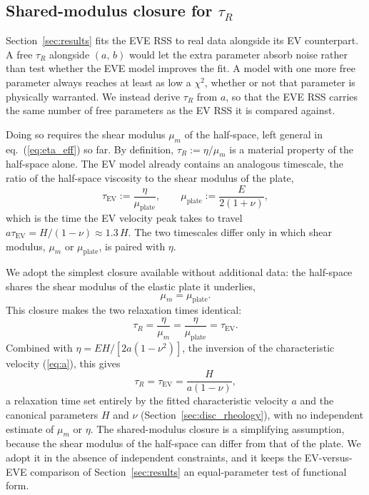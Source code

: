 \documentclass[extra]{gji}
\begin{document}
\subsection{Shared-modulus closure for $\tau_R$}
\label{sec:tauR_shared}

Section~\ref{sec:results} fits the EVE RSS to real data alongside its
EV counterpart.  A free $\tau_R$ alongside $(a,\,b)$ would let the extra
parameter absorb noise rather than test whether the EVE model improves the
fit.  A model with one more free parameter always reaches at least as low a
$\chi^2$, whether or not that parameter is physically warranted.  We
instead derive $\tau_R$ from $a$, so that the EVE RSS carries the same
number of free parameters as the EV RSS it is compared against.

Doing so requires the shear modulus $\mu_m$ of the half-space, left
general in eq.~(\ref{eq:eta_eff}) so far. By definition,
$\tau_R := \eta/\mu_m$ is a material property of the half-space alone.
The EV model already contains an analogous timescale, the ratio of the
half-space viscosity to the shear modulus of the plate,
\begin{equation}
\tau_{\text{EV}} := \frac{\eta}{\mu_{\text{plate}}}, \qquad
\mu_{\text{plate}} := \frac{E}{2(1+\nu)},
\label{eq:tau_EV}
\end{equation}
which is the time the EV velocity peak takes to travel
$a\tau_{\text{EV}} = H/(1-\nu) \approx 1.3\,H$. The two timescales differ
only in which shear modulus, $\mu_m$ or $\mu_{\text{plate}}$, is paired with
$\eta$.

We adopt the simplest closure available without additional data: the
half-space shares the shear modulus of the elastic plate it underlies,
\begin{equation}
\mu_m = \mu_{\text{plate}}.
\label{eq:mu_shared}
\end{equation}
This closure makes the two relaxation times identical:
\begin{equation}
\tau_R = \frac{\eta}{\mu_m} = \frac{\eta}{\mu_{\text{plate}}} =
  \tau_{\text{EV}}.
\end{equation}
Combined with $\eta = EH/[2a(1-\nu^2)]$, the inversion of the characteristic
velocity (\ref{eq:a}), this gives
\begin{equation}
\tau_R = \tau_{\text{EV}} = \frac{H}{a(1-\nu)},
\label{eq:tau_R_shared}
\end{equation}
a relaxation time set entirely by the fitted characteristic velocity $a$
and the canonical parameters $H$ and $\nu$ (Section~\ref{sec:disc_rheology}),
with no independent estimate of $\mu_m$ or $\eta$.  The shared-modulus
closure is a simplifying assumption, because the shear modulus of the
half-space can differ from that of the plate.  We adopt it in the absence of independent
constraints, and it keeps
the EV-versus-EVE comparison of Section~\ref{sec:results} an
equal-parameter test of functional form.
\end{document}
